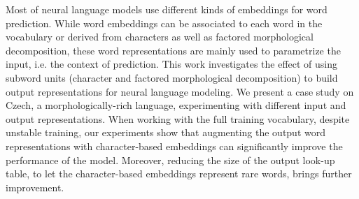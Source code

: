 Most of neural language models use different kinds of embeddings for word prediction. While word embeddings can be associated to each word in the vocabulary or derived from characters as well as factored morphological decomposition, these word representations are mainly used to parametrize the input, i.e. the context of prediction.  This work investigates the effect of using subword units (character and factored morphological decomposition) to build output representations for neural language modeling. We present a case study on Czech, a morphologically-rich language, experimenting with different input and output representations.  When working with the full training vocabulary, despite unstable training, our experiments show that augmenting the output word representations with character-based embeddings can significantly improve the performance of the model. Moreover, reducing the size of the output look-up table, to let the character-based embeddings represent rare words, brings further improvement.
